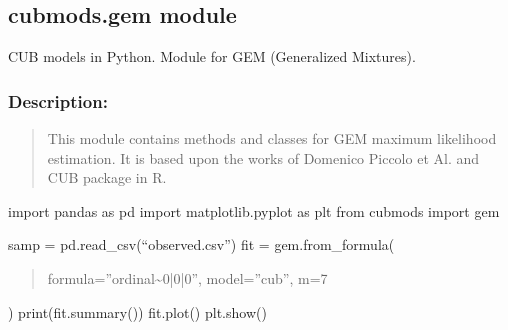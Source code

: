 \documentclass[letterpaper,10pt,english]{sphinxmanual}
\begin{document}
\subsection{cubmods.gem module}
\label{\detokenize{cubmods:module-cubmods.gem}}\label{\detokenize{cubmods:cubmods-gem-module}}
\sphinxAtStartPar
CUB models in Python.
Module for GEM (Generalized Mixtures).


\subsubsection{Description:}
\label{\detokenize{cubmods:id243}}\begin{quote}

\sphinxAtStartPar
This module contains methods and classes
for GEM maximum likelihood estimation.
It is based upon the works of Domenico
Piccolo et Al. and CUB package in R.
\end{quote}
\begin{description}
\sphinxAtStartPar
import pandas as pd
import matplotlib.pyplot as plt
from cubmods import gem

\sphinxAtStartPar
samp = pd.read\_csv(“observed.csv”)
fit = gem.from\_formula(
\begin{quote}

\sphinxAtStartPar
formula=”ordinal\textasciitilde{}0|0|0”,
model=”cub”,
m=7
\end{quote}

\sphinxAtStartPar
)
print(fit.summary())
fit.plot()
plt.show()

\end{description}
\end{document}
